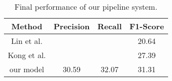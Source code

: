 \begin{table}[!htbp]
\centering
\begin{tabular}{|c|c|c|c|}
\hline

Method      &    Precision &     Recall &     F1-Score \\ \hline
Lin et al.  &              &            &     20.64    \\ \hline
Kong et al. &              &            &     27.39    \\ \hline
our model   &    30.59     &     32.07  &     31.31    \\ \hline


\end{tabular}
\caption{\label{t:final-results} Final performance of our pipeline system. }
\end{table}
